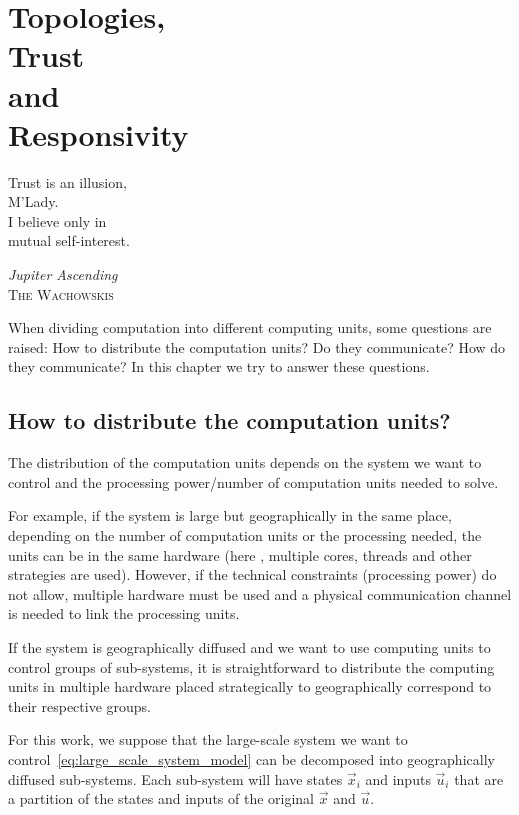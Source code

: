 \documentclass[../main.tex]{subfiles}
\begin{document}
\chapter[Topologies, Trust and Responsivity]{Topologies,\\ Trust\\ and \\Responsivity}\label{sec:topoly_trust}
\epigraph{\centering Trust is an illusion, \\M'Lady. \\I believe only in \\mutual self-interest.}
{\textit{Jupiter Ascending}\\\textsc{The Wachowskis}}


When dividing computation into different computing units, some questions are raised:
How to distribute the computation units?
Do they communicate?
How do they communicate?
In this chapter we try to answer these questions.

\minitoc

\section{How to distribute the computation units?}

The distribution of the computation units depends on the system we want to control and the processing power/number of computation units needed to solve.

For example, if the system is large but geographically in the same place, depending on the number of computation units or the processing needed, the units can be in the same hardware (here \GPU, multiple cores, threads and other strategies are used).
However, if the technical constraints (processing power) do not allow, multiple hardware must be used and a physical communication channel is needed to link the processing units.

If the system is geographically diffused and we want to use computing units to control groups of sub-systems, it is straightforward to distribute the computing units in multiple hardware placed strategically to geographically correspond to their respective groups.

For this work, we suppose that the large-scale system we want to control~\eqref{eq:large_scale_system_model} can be decomposed into geographically diffused sub-systems.
Each sub-system will have states $\vec{x}_{i}$ and inputs $\vec{u}_{i}$ that are a partition of the states and inputs of the original $\vec{x}$ and $\vec{u}$.
\end{document}
